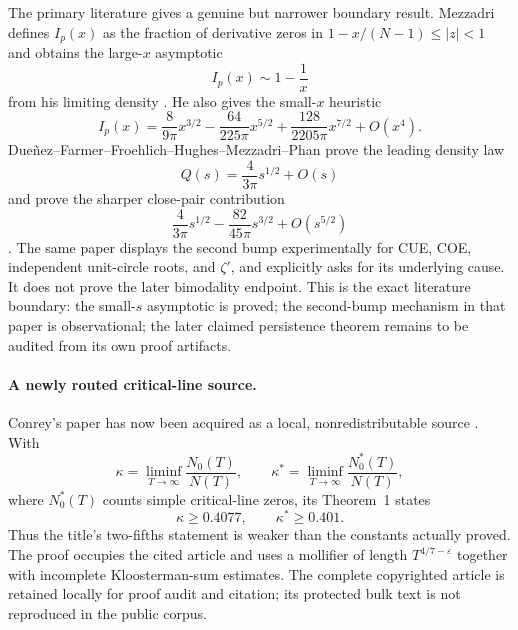 The primary literature gives a genuine but narrower boundary result.  Mezzadri defines
$I_p(x)$ as the fraction of derivative zeros in
$1-x/(N-1)\leq|z|<1$ and obtains the large-$x$ asymptotic
\begin{equation}
 I_p(x)\sim1-\frac1x
 \label{eq:Mezzadri-annulus-fraction}
\end{equation}
from his limiting density \cite[Sec.~3]{mezzadri2003ZetaPrime}.  He also gives the
small-$x$ heuristic
\begin{equation}
 I_p(x)=\frac{8}{9\pi}x^{3/2}-\frac{64}{225\pi}x^{5/2}
        +\frac{128}{2205\pi}x^{7/2}+O(x^4).
 \label{eq:Mezzadri-small-x-heuristic}
\end{equation}
Due\~nez--Farmer--Froehlich--Hughes--Mezzadri--Phan prove the leading density law
\begin{equation}
 Q(s)=\frac{4}{3\pi}s^{1/2}+O(s)
 \label{eq:DFFHMP-leading-density}
\end{equation}
and prove the sharper close-pair contribution
\begin{equation}
 \frac{4}{3\pi}s^{1/2}-\frac{82}{45\pi}s^{3/2}+O(s^{5/2})
 \label{eq:DFFHMP-close-pair-density}
\end{equation}
\cite[Thm.~3.1 and Cor.~3.2]{duenezEtAl2010}.  The same paper displays the second bump
experimentally for CUE, COE, independent unit-circle roots, and $\zeta'$, and explicitly
asks for its underlying cause.  It does not prove the later bimodality endpoint.  This is
the exact literature boundary: the small-$s$ asymptotic is proved; the second-bump
mechanism in that paper is observational; the later claimed persistence theorem remains
to be audited from its own proof artifacts.

\paragraph{A newly routed critical-line source.}
Conrey's paper has now been acquired as a local, nonredistributable source
\cite{conrey1989TwoFifths}.  With
\[
 \kappa=\liminf_{T\to\infty}\frac{N_0(T)}{N(T)},\qquad
 \kappa^*=\liminf_{T\to\infty}\frac{N_0^*(T)}{N(T)},
\]
where $N_0^*(T)$ counts simple critical-line zeros, its Theorem~1 states
\begin{equation}
 \kappa\geq0.4077,\qquad \kappa^*\geq0.401.
 \label{eq:Conrey-two-fifths}
\end{equation}
Thus the title's two-fifths statement is weaker than the constants actually proved.
The proof occupies the cited article and uses a mollifier of length
$T^{4/7-\varepsilon}$ together with incomplete Kloosterman-sum estimates.  The complete
copyrighted article is retained locally for proof audit and citation; its protected bulk
text is not reproduced in the public corpus.

